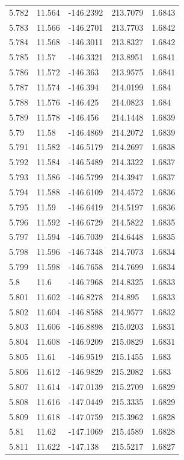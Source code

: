 \begin{tabular}{lllll}
5.782 & 11.564 & -146.2392 & 213.7079 & 1.6843 \\
5.783 & 11.566 & -146.2701 & 213.7703 & 1.6842 \\
5.784 & 11.568 & -146.3011 & 213.8327 & 1.6842 \\
5.785 & 11.57 & -146.3321 & 213.8951 & 1.6841 \\
5.786 & 11.572 & -146.363 & 213.9575 & 1.6841 \\
5.787 & 11.574 & -146.394 & 214.0199 & 1.684 \\
5.788 & 11.576 & -146.425 & 214.0823 & 1.684 \\
5.789 & 11.578 & -146.456 & 214.1448 & 1.6839 \\
5.79 & 11.58 & -146.4869 & 214.2072 & 1.6839 \\
5.791 & 11.582 & -146.5179 & 214.2697 & 1.6838 \\
5.792 & 11.584 & -146.5489 & 214.3322 & 1.6837 \\
5.793 & 11.586 & -146.5799 & 214.3947 & 1.6837 \\
5.794 & 11.588 & -146.6109 & 214.4572 & 1.6836 \\
5.795 & 11.59 & -146.6419 & 214.5197 & 1.6836 \\
5.796 & 11.592 & -146.6729 & 214.5822 & 1.6835 \\
5.797 & 11.594 & -146.7039 & 214.6448 & 1.6835 \\
5.798 & 11.596 & -146.7348 & 214.7073 & 1.6834 \\
5.799 & 11.598 & -146.7658 & 214.7699 & 1.6834 \\
5.8 & 11.6 & -146.7968 & 214.8325 & 1.6833 \\
5.801 & 11.602 & -146.8278 & 214.895 & 1.6833 \\
5.802 & 11.604 & -146.8588 & 214.9577 & 1.6832 \\
5.803 & 11.606 & -146.8898 & 215.0203 & 1.6831 \\
5.804 & 11.608 & -146.9209 & 215.0829 & 1.6831 \\
5.805 & 11.61 & -146.9519 & 215.1455 & 1.683 \\
5.806 & 11.612 & -146.9829 & 215.2082 & 1.683 \\
5.807 & 11.614 & -147.0139 & 215.2709 & 1.6829 \\
5.808 & 11.616 & -147.0449 & 215.3335 & 1.6829 \\
5.809 & 11.618 & -147.0759 & 215.3962 & 1.6828 \\
5.81 & 11.62 & -147.1069 & 215.4589 & 1.6828 \\
5.811 & 11.622 & -147.138 & 215.5217 & 1.6827 \\

\end{tabular}
